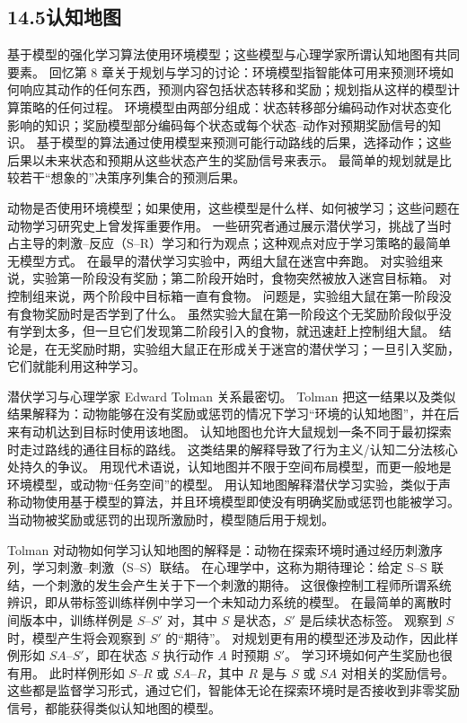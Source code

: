 \documentclass[UTF8, 12pt, fontset=fandol, oneside]{ctexart}
\begin{document}
\subsection*{14.5\quad 认知地图}

基于模型的强化学习算法使用环境模型；这些模型与心理学家所谓认知地图有共同要素。
回忆第 8 章关于规划与学习的讨论：环境模型指智能体可用来预测环境如何响应其动作的任何东西，预测内容包括状态转移和奖励；规划指从这样的模型计算策略的任何过程。
环境模型由两部分组成：状态转移部分编码动作对状态变化影响的知识；奖励模型部分编码每个状态或每个状态--动作对预期奖励信号的知识。
基于模型的算法通过使用模型来预测可能行动路线的后果，选择动作；这些后果以未来状态和预期从这些状态产生的奖励信号来表示。
最简单的规划就是比较若干“想象的”决策序列集合的预测后果。

动物是否使用环境模型；如果使用，这些模型是什么样、如何被学习；这些问题在动物学习研究史上曾发挥重要作用。
一些研究者通过展示潜伏学习，挑战了当时占主导的刺激--反应（S--R）学习和行为观点；这种观点对应于学习策略的最简单无模型方式。
在最早的潜伏学习实验中，两组大鼠在迷宫中奔跑。
对实验组来说，实验第一阶段没有奖励；第二阶段开始时，食物突然被放入迷宫目标箱。
对控制组来说，两个阶段中目标箱一直有食物。
问题是，实验组大鼠在第一阶段没有食物奖励时是否学到了什么。
虽然实验大鼠在第一阶段这个无奖励阶段似乎没有学到太多，但一旦它们发现第二阶段引入的食物，就迅速赶上控制组大鼠。
结论是，在无奖励时期，实验组大鼠正在形成关于迷宫的潜伏学习；一旦引入奖励，它们就能利用这种学习。

潜伏学习与心理学家 Edward Tolman 关系最密切。
Tolman 把这一结果以及类似结果解释为：动物能够在没有奖励或惩罚的情况下学习“环境的认知地图”，并在后来有动机达到目标时使用该地图。
认知地图也允许大鼠规划一条不同于最初探索时走过路线的通往目标的路线。
这类结果的解释导致了行为主义/认知二分法核心处持久的争议。
用现代术语说，认知地图并不限于空间布局模型，而更一般地是环境模型，或动物“任务空间”的模型。
用认知地图解释潜伏学习实验，类似于声称动物使用基于模型的算法，并且环境模型即使没有明确奖励或惩罚也能被学习。
当动物被奖励或惩罚的出现所激励时，模型随后用于规划。

Tolman 对动物如何学习认知地图的解释是：动物在探索环境时通过经历刺激序列，学习刺激--刺激（S--S）联结。
在心理学中，这称为期待理论：给定 S--S 联结，一个刺激的发生会产生关于下一个刺激的期待。
这很像控制工程师所谓系统辨识，即从带标签训练样例中学习一个未知动力系统的模型。
在最简单的离散时间版本中，训练样例是 $S$--$S'$ 对，其中 $S$ 是状态，$S'$ 是后续状态标签。
观察到 $S$ 时，模型产生将会观察到 $S'$ 的“期待”。
对规划更有用的模型还涉及动作，因此样例形如 $SA$--$S'$，即在状态 $S$ 执行动作 $A$ 时预期 $S'$。
学习环境如何产生奖励也很有用。
此时样例形如 $S$--$R$ 或 $SA$--$R$，其中 $R$ 是与 $S$ 或 $SA$ 对相关的奖励信号。
这些都是监督学习形式，通过它们，智能体无论在探索环境时是否接收到非零奖励信号，都能获得类似认知地图的模型。
\end{document}

